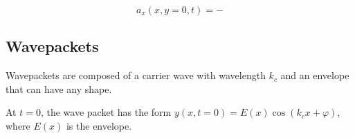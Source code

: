 \documentclass[a4paper,12pt]{report}
\begin{document}
\begin{equation}
	a_{x}(x,y=0,t) = - 
\end{equation}

\subsection{Wavepackets}

Wavepackets are composed of a carrier wave with wavelength \(k_{c} \) and an envelope that can have any shape. 

At \(t=0\), the wave packet has the form \(y(x,t=0) = E(x)\cos (k_{c}x+\varphi  )\), where \(E(x)\) is the envelope.   
\end{document}
